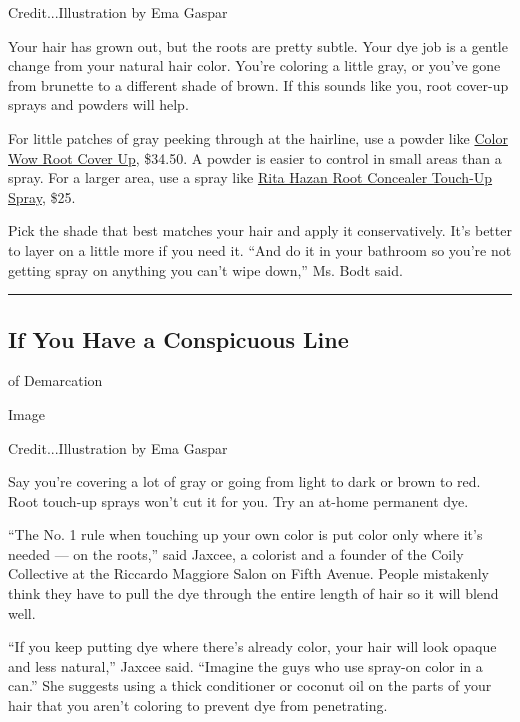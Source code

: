 Credit...Illustration by Ema Gaspar

Your hair has grown out, but the roots are pretty subtle. Your dye job
is a gentle change from your natural hair color. You're coloring a
little gray, or you've gone from brunette to a different shade of brown.
If this sounds like you, root cover-up sprays and powders will help.

For little patches of gray peeking through at the hairline, use a powder
like \href{https://www.colorwowhair.com/us/root-cover-up}{Color Wow Root
Cover Up}, \$34.50. A powder is easier to control in small areas than a
spray. For a larger area, use a spray like
\href{https://ritahazan.com/products/root-concealer-color-spray}{Rita
Hazan Root Concealer Touch-Up Spray}, \$25.

Pick the shade that best matches your hair and apply it conservatively.
It's better to layer on a little more if you need it. ``And do it in
your bathroom so you're not getting spray on anything you can't wipe
down,'' Ms. Bodt said.

\begin{center}\rule{0.5\linewidth}{\linethickness}\end{center}

\hypertarget{if-you-have-a-conspicuous-line}{%
\subsection{If You Have a Conspicuous
Line}\label{if-you-have-a-conspicuous-line}}

of Demarcation

Image

Credit...Illustration by Ema Gaspar

Say you're covering a lot of gray or going from light to dark or brown
to red. Root touch-up sprays won't cut it for you. Try an at-home
permanent dye.

``The No. 1 rule when touching up your own color is put color only where
it's needed --- on the roots,'' said Jaxcee, a colorist and a founder of
the Coily Collective at the Riccardo Maggiore Salon on Fifth Avenue.
People mistakenly think they have to pull the dye through the entire
length of hair so it will blend well.

``If you keep putting dye where there's already color, your hair will
look opaque and less natural,'' Jaxcee said. ``Imagine the guys who use
spray-on color in a can.'' She suggests using a thick conditioner or
coconut oil on the parts of your hair that you aren't coloring to
prevent dye from penetrating.


